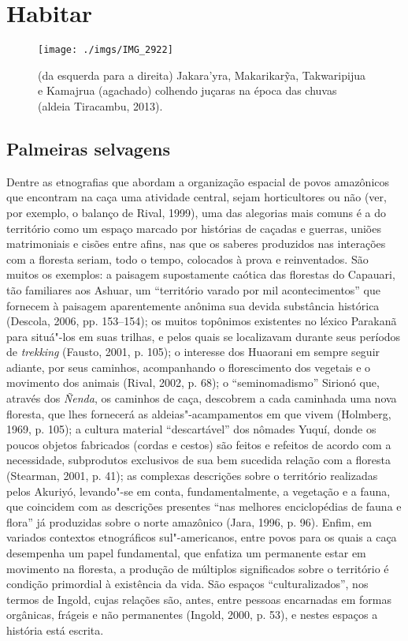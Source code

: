 
\chapter*{Habitar}\label{habitar}

\begin{figure}[H]
\centering
  \texttt{[image: ./imgs/IMG\_2922]}
\caption{(da esquerda para a direita) Jakara'yra, Makarikarỹa, Takwaripijua e Kamajrua
(agachado) colhendo juçaras na época das chuvas (aldeia Tiracambu, 2013).}
\end{figure}

\section{Palmeiras selvagens}

Dentre as etnografias que abordam a organização espacial de povos
amazônicos que encontram na caça uma atividade central, sejam
horticultores ou não (ver, por exemplo, o balanço de Rival, 1999), uma
das alegorias mais comuns é a do território como um espaço marcado por
histórias de caçadas e guerras, uniões matrimoniais e cisões entre
afins, nas que os saberes produzidos nas interações com a floresta
seriam, todo o tempo, colocados à prova e reinventados. São muitos os
exemplos: a paisagem supostamente caótica das florestas do Capauari, tão
familiares aos Ashuar, um ``território varado por mil acontecimentos''
que fornecem à paisagem aparentemente anônima sua devida substância
histórica (Descola, 2006, pp. 153--154); os muitos topônimos existentes no
léxico Parakanã para situá"-los em suas trilhas, e pelos quais se
localizavam durante seus períodos de \emph{trekking} (Fausto, 2001, p.
105); o interesse dos Huaorani em sempre seguir adiante, por seus
caminhos, acompanhando o florescimento dos vegetais e o movimento dos
animais (Rival, 2002, p. 68); o ``seminomadismo'' Sirionó que, através
dos \emph{Ñenda}, os caminhos de caça, descobrem a cada caminhada uma
nova floresta, que lhes fornecerá as aldeias"-acampamentos em que vivem
(Holmberg, 1969, p. 105); a cultura material ``descartável'' dos nômades
Yuquí, donde os poucos objetos fabricados (cordas e cestos) são feitos e
refeitos de acordo com a necessidade, subprodutos exclusivos de sua bem
sucedida relação com a floresta (Stearman, 2001, p. 41); as complexas
descrições sobre o território realizadas pelos Akuriyó, levando"-se em
conta, fundamentalmente, a vegetação e a fauna, que coincidem com as
descrições presentes ``nas melhores enciclopédias de fauna e flora'' já
produzidas sobre o norte amazônico (Jara, 1996, p. 96). Enfim, em
variados contextos etnográficos sul"-americanos, entre povos para os
quais a caça desempenha um papel fundamental, que enfatiza um permanente
estar em movimento na floresta, a produção de múltiplos significados
sobre o território é condição primordial à existência da vida. São
espaços ``culturalizados'', nos termos de Ingold, cujas relações são,
antes, entre pessoas encarnadas em formas orgânicas, frágeis e não
permanentes (Ingold, 2000, p. 53), e nestes espaços a história está
escrita.

